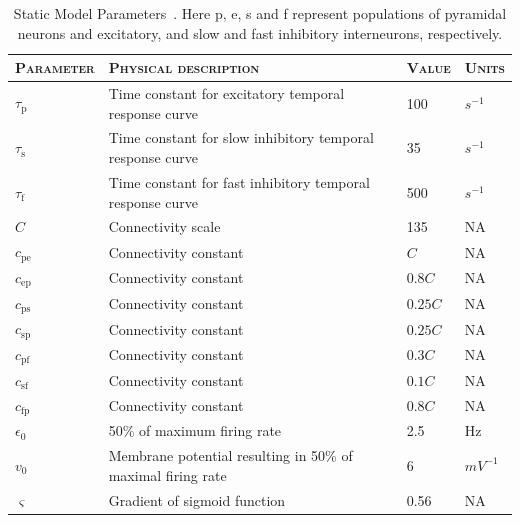\singlespacing 
\footnotesize
\begin{center}%
	\begin{table}
			\caption{Static Model Parameters~\citep{wendling2002epileptic}. Here p, e, s and f represent populations of pyramidal neurons and excitatory, and slow and fast inhibitory interneurons, respectively.}
		\begin{tabular}{||p{2.5cm}|p{9cm}|p{1.2cm}|p{1cm}||}\hline
			 \textsc{Parameter}  & \textsc{Physical description} & \textsc{Value} & \textsc{Units}  \\\hline\hline
			 $\tau_{\mathrm{p}}$ & Time constant for excitatory temporal response curve & 100 & $s^{-1}$\\\hline
			 $\tau_{\mathrm{s}}$ & Time constant for slow inhibitory temporal response curve & 35 & $s^{-1}$\\\hline
			 $\tau_{\mathrm{f}}$ & Time constant for fast inhibitory temporal response curve & 500 & $s^{-1}$\\\hline
			 $C$ & Connectivity scale & 135 & NA\\\hline
			 $c_{\mathrm{pe}}$ & Connectivity constant  & $C$ & NA \\\hline
			 $c_{\mathrm{ep}}$ & Connectivity constant  & $0.8C$ & NA\\\hline
			 $c_{\mathrm{ps}}$ & Connectivity constant  & $0.25C$ & NA \\\hline
			 $c_{\mathrm{sp}}$ & Connectivity constant  & $0.25C$ & NA\\\hline
			 $c_{\mathrm{pf}}$ & Connectivity constant  & $0.3C$ & NA\\\hline
			 $c_{\mathrm{sf}}$ & Connectivity constant  & $0.1C$ & NA\\\hline
			 $c_{\mathrm{fp}}$ & Connectivity constant  & $0.8C$ & NA\\\hline
			 $\epsilon_{0}$ & 50\% of maximum firing rate & 2.5 & Hz \\\hline
			 $v_{0}$ & Membrane potential resulting in 50\% of maximal firing rate & 6 & $mV^{-1}$\\\hline
			 $\varsigma$ & Gradient of sigmoid function & 0.56 & NA \\\hline
		\end{tabular}
		\label{tab: Static}
	\end{table}
\end{center}%
\doublespacing
\normalsize

